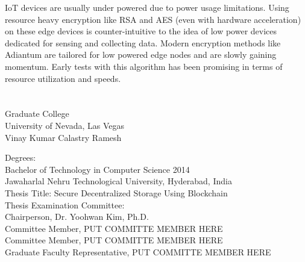 \documentclass[11pt,openright]{report}
\begin{document}
IoT devices are usually under powered due to power usage limitations. Using resource heavy encryption like RSA and AES (even with hardware acceleration) on these edge devices is counter-intuitive to the idea of low power devices dedicated for sensing and collecting data. Modern encryption methods like Adiantum \cite{DBLP:journals/tosc/CrowleyB18} are tailored for low powered edge nodes and are slowly gaining momentum. Early tests with this algorithm has been promising in terms of resource utilization and speeds.







\vita
\chapter{} %
\linespread{1.3} 
\begin{center}
Graduate College\\
University of Nevada, Las Vegas\\[1cm]
Vinay Kumar Calastry Ramesh\\[1cm]
\end{center}

\noindent Degrees:\\
\indent Bachelor of Technology in Computer Science 2014\\
\indent Jawaharlal Nehru Technological University, Hyderabad, India\\

\noindent Thesis Title: Secure Decentralized Storage Using Blockchain\\

\noindent Thesis Examination Committee:\\
\indent Chairperson, Dr. Yoohwan Kim, Ph.D.\\
\indent Committee Member, PUT COMMITTE MEMBER HERE\\
\indent Committee Member, PUT COMMITTE MEMBER HERE\\
\indent Graduate Faculty Representative, PUT COMMITTE MEMBER HERE\\
\end{document}
